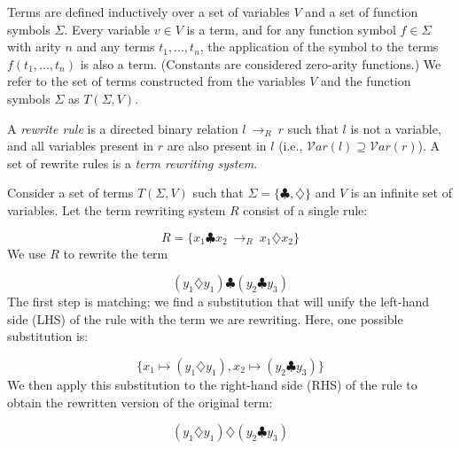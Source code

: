 \documentclass[acmsmall,review]{acmart}\settopmatter{printfolios=true,printccs=false,printacmref=false}
\newcommand{\rewrites}[0]{\:\rightarrow_{R}\:}
\begin{document}
Terms are defined inductively over a set of variables $V$ and a set of function symbols $\Sigma$. Every variable $v \in V$ is a term, and for any function symbol $f \in \Sigma$ with arity $n$ and any terms $t_1, ..., t_n$, the application of the symbol to the terms $f(t_1, ..., t_n)$ is also a term. (Constants are considered zero-arity functions.) We refer to the set of terms constructed from the variables $V$ and the function symbols $\Sigma$ as $T(\Sigma, V)$.

A \emph{rewrite rule} is a directed binary relation $l \rewrites r$ such that $l$ is not a variable, and all variables present in $r$ are also present in $l$ (i.e., $\mathcal{V}ar(l) \supseteq \mathcal{V}ar(r)$). A set of rewrite rules is a \emph{term rewriting system}.

Consider a set of terms $T(\Sigma, V)$ such that $\Sigma = \{\clubsuit, \diamondsuit\}$ and $V$ is an infinite set of variables. Let the term rewriting system $R$ consist of a single rule:

\[ R = \{ x_1 \clubsuit x_2 \rewrites x_1 \diamondsuit x_2 \} \]
We use $R$ to rewrite the term

\[ 
(y_1 \diamondsuit y_1) \clubsuit (y_2 \clubsuit y_3)
\]
The first step is matching; we find a substitution that will unify the left-hand side (LHS) of the rule with the term we are rewriting. Here, one possible substitution is:

\[
\{ x_1 \mapsto (y_1 \diamondsuit y_1), x_2 \mapsto (y_2 \clubsuit y_3) \}
\]
We then apply this substitution to the right-hand side (RHS) of the rule to obtain the rewritten version of the original term:

\[ 
(y_1 \diamondsuit y_1) \diamondsuit (y_2 \clubsuit y_3)
\]
\end{document}
